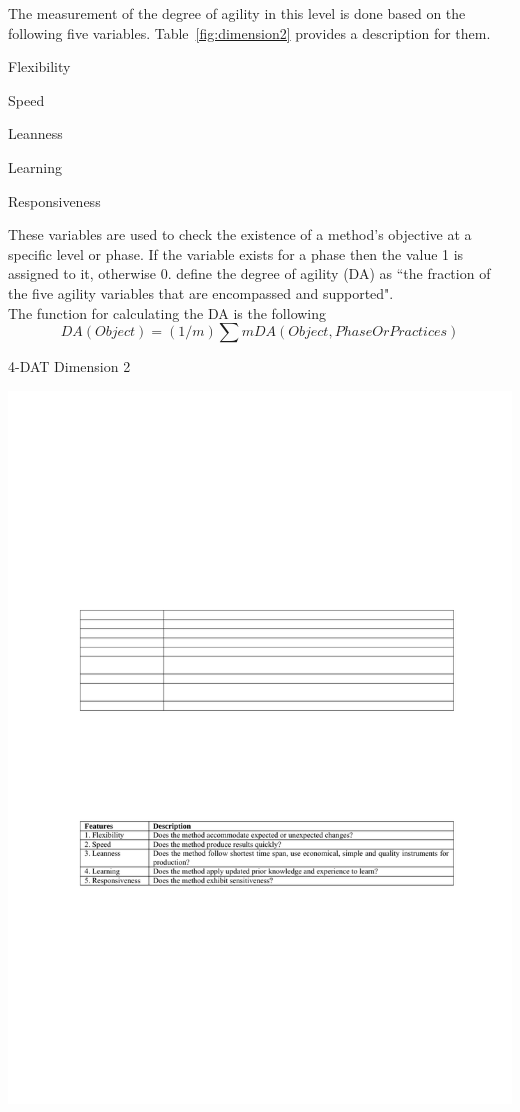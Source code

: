 The measurement of the degree of agility in this level is done based on the following five variables. Table~\ref{fig:dimension2} provides a description for them.
\begin{inparaenum} [a\upshape)]
\item Flexibility
\item Speed
\item Leanness
\item Learning
\item Responsiveness
\end{inparaenum}

These variables are used to check the existence of a method's objective at a specific level or phase. If the variable exists for a phase then the value 1 is assigned to it, otherwise 0. \citet{qumer2006measuring} define the degree of agility (DA) as ``the fraction of the five agility variables that are encompassed and supported".\\ %

The function for calculating the DA is the following\\
\begin{equation} DA (Object) = (1/m) \sum m DA(Object, Phase Or Practices) \end{equation}

\begin{table}[H]
\caption{4-DAT Dimension 2}
\label{fig:dimension2}
\centerline{\includegraphics[scale=0.8]{include/relatedwork/fig/qumer_dimension2.pdf}}
\end{table}

